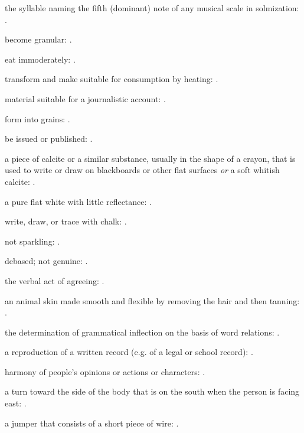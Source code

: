   the syllable naming the fifth (dominant) note of any musical scale in solmization:   .

  become granular:   .

  eat immoderately:   .

  transform and make suitable for consumption by heating: .

  material suitable for a journalistic account: .

  form into grains:   .

  be issued or published:   .

  a piece of calcite or a similar substance, usually in the shape of a crayon, that is used to write or draw on blackboards or other flat surfaces \textit{or} a soft whitish calcite: .

  a pure flat white with little reflectance: .

  write, draw, or trace with chalk: .

  not sparkling:   .

  debased; not genuine: .

  the verbal act of agreeing: .

  an animal skin made smooth and flexible by removing the hair and then tanning: .

  the determination of grammatical inflection on the basis of word relations:   .

  a reproduction of a written record (e.g. of a legal or school record):   .

  harmony of people's opinions or actions or characters:   .

  a turn toward the side of the body that is on the south when the person is facing east: .

  a jumper that consists of a short piece of wire:   .

